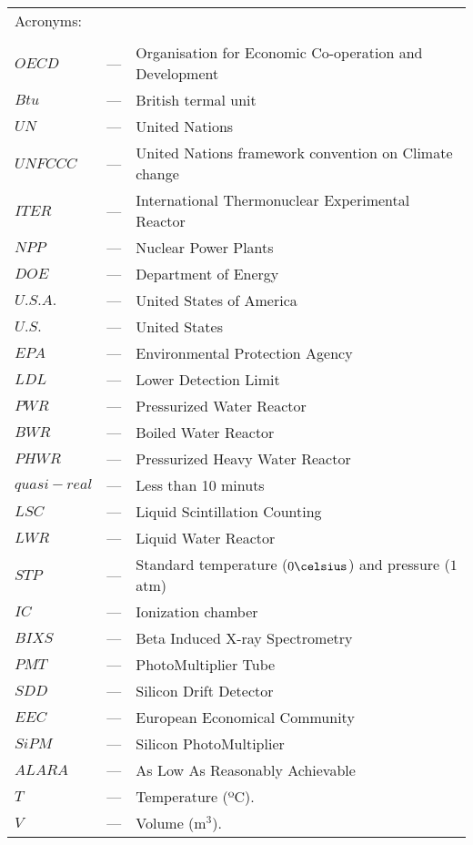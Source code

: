 \begin{longtable}{p{25mm} c p{120mm} }
\multicolumn{3}{l}{Acronyms:}\\
\\
$OECD$ & --- & Organisation for Economic Co-operation and Development\\
$Btu$ & --- & British termal unit\\
$UN$ & --- & United Nations\\
$UNFCCC$ & --- & United Nations framework convention on Climate change\\
$ITER$ & --- & International Thermonuclear Experimental Reactor\\
$NPP$ & --- & Nuclear Power Plants\\
$DOE$ & --- & Department of Energy\\
$U.S.A.$ & --- & United States of America\\
$U.S.$ & --- & United States\\
$EPA$ & --- & Environmental Protection Agency\\
$LDL$ & --- & Lower Detection Limit\\
$PWR$ & --- & Pressurized Water Reactor\\
$BWR$ & --- & Boiled Water Reactor\\
$PHWR$ & --- & Pressurized Heavy Water Reactor\\
$quasi-real$ & --- & Less than 10 minuts\\
$LSC$ & --- & Liquid Scintillation Counting\\
$LWR$ & --- & Liquid Water Reactor\\
$STP$ & --- & Standard temperature ($0\celsius$) and pressure ($1$ atm)\\
$IC$ & --- & Ionization chamber\\
$BIXS$ & --- & Beta Induced X-ray Spectrometry\\
$PMT$ & --- & PhotoMultiplier Tube\\
$SDD$ & --- & Silicon Drift Detector\\
$EEC$ & --- & European Economical Community\\
$SiPM$ & --- & Silicon PhotoMultiplier\\
$ALARA$ & --- & As Low As Reasonably Achievable\\






$T$ & --- & Temperature (ºC).\\
$V$ & --- & Volume (m$^3$).\\



\end{longtable}
